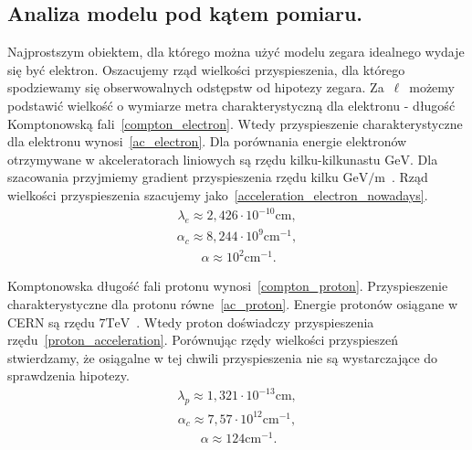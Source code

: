 \subsection{Analiza modelu pod kątem pomiaru.}
Najprostszym obiektem, dla którego można użyć modelu zegara 
idealnego wydaje się być elektron. 
Oszacujemy rząd wielkości przyspieszenia, dla którego spodziewamy się 
obserwowalnych odstępstw od hipotezy zegara.
Za~$\ell$~możemy podstawić wielkość o wymiarze metra 
charakterystyczną dla elektronu - długość 
Komptonowską fali~\eqref{compton_electron}. 
Wtedy przyspieszenie charakterystyczne dla elektronu 
wynosi~\eqref{ac_electron}.
Dla porównania energie elektronów otrzymywane 
w akceleratorach liniowych są rzędu 
kilku-kilkunastu $\si{\giga\electronvolt}$.
Dla szacowania przyjmiemy gradient przyspieszenia rzędu
kilku $ \si{\giga\electronvolt \per \metre}$~\cite{Ghotra2015}.
Rząd wielkości przyspieszenia 
szacujemy jako~\eqref{acceleration_electron_nowadays}.
\begin{align}\label{compton_electron}
\lambda_e  \approx 2,426 \cdot 10^{-10} \si{\centi\metre} ,
\end{align}
\begin{align}\label{ac_electron}
\alpha_c \approx 8,244\cdot 10^{9} \si{ \centi\metre^{-1}} ,
\end{align}
\begin{align}~\label{acceleration_electron_nowadays}
\alpha \approx 10^2 \si{\centi\metre^{-1}} .
\end{align}

Komptonowska długość fali protonu wynosi~\eqref{compton_proton}. 
Przyspieszenie charakterystyczne dla protonu równe~\eqref{ac_proton}.
Energie protonów osiągane w CERN są rzędu 
$7 \si{\tera\electronvolt}$~\cite{CERN}. Wtedy 
proton doświadczy przyspieszenia
rzędu~\eqref{proton_acceleration}.
Porównując rzędy wielkości przyspieszeń stwierdzamy, 
że osiągalne w tej chwili przyspieszenia nie są wystarczające 
do sprawdzenia hipotezy.
\begin{align}\label{compton_proton}
\lambda_p  \approx 1,321 \cdot 10^{-13} \si{\centi\metre} ,
\end{align}
\begin{align}\label{ac_proton}
\alpha_c \approx 7,57 \cdot 10^{12} \si{ \centi\metre^{-1}} ,
\end{align}
\begin{align}~\label{proton_acceleration}
\alpha \approx 124  \si{\centi\metre^{-1}} .
\end{align}
